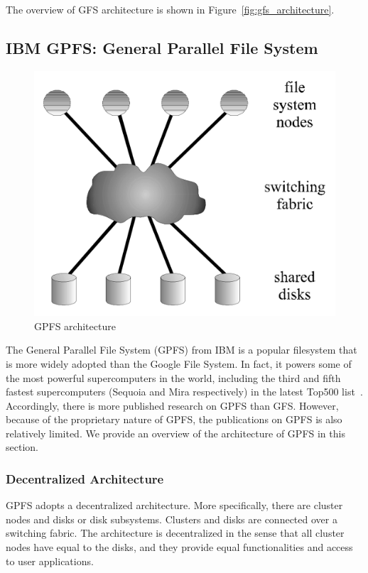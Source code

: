 The overview of GFS architecture is shown in Figure~\ref{fig:gfs_architecture}.



\subsection{IBM GPFS: General Parallel File System}
\label{sec:archi_gpfs}
%
\begin{figure}
\centering
\includegraphics[width=0.95\columnwidth]{image/gpfs_architecture.png}
\caption{GPFS architecture}
\label{fig:gpfs_archi}
\end{figure}
%
The General Parallel File System (GPFS) from IBM is a popular filesystem
that is more widely adopted than the Google File System. 
%
In fact, it powers some of the most powerful supercomputers in the world,
including the third and fifth fastest supercomputers (Sequoia and Mira 
respectively) in the latest Top500 list~\cite{Strohmaier:2006:TS:1188455.1188474}.
%
Accordingly, there is more published research on GPFS than GFS.
%
However, because of the proprietary nature of GPFS, the publications on 
GPFS is also relatively limited. 
%
We provide an overview of the architecture of GPFS in this section.


\subsubsection{Decentralized Architecture}
GPFS adopts a decentralized architecture.
%
More specifically, there are cluster nodes and disks or disk subsystems.
%
Clusters and disks are connected over a switching fabric.
%
The architecture is decentralized in the sense that all cluster nodes 
have equal to the disks, and they provide equal functionalities and access
to user applications.

